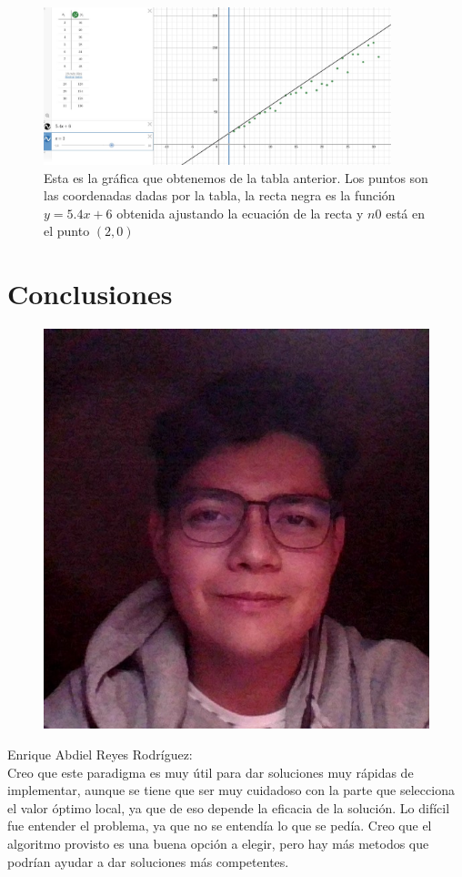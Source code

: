 \documentclass{article}
\begin{document}
        \begin{figure}[h!]
            \centering
            \includegraphics[width=0.9\textwidth]{greedy_graph.jpeg}
            \caption{Esta es la gráfica que obtenemos de la tabla anterior. Los puntos son las coordenadas dadas por la tabla, la recta negra es la función $y=5.4x+6$ obtenida ajustando la ecuación de la recta y $n0$ está en el punto $(2,0)$}
            \label{fig:my_label}
        \end{figure}
   
        
        
    
\newpage
\section{Conclusiones}
    \begin{figure}
        \centering
        \includegraphics[scale=0.2]{abdiel.png}
    \end{figure}
    Enrique Abdiel Reyes Rodríguez:\\
    Creo que este paradigma es muy útil para dar soluciones muy rápidas de implementar, aunque se tiene que ser muy cuidadoso con la parte que selecciona el valor óptimo local, ya que de eso depende la eficacia de la solución. Lo difícil fue entender el problema, ya que no se entendía lo que se pedía. Creo que el algoritmo provisto es una buena opción a elegir, pero hay más metodos que podrían ayudar a dar soluciones más competentes.\\
    
\end{document}
